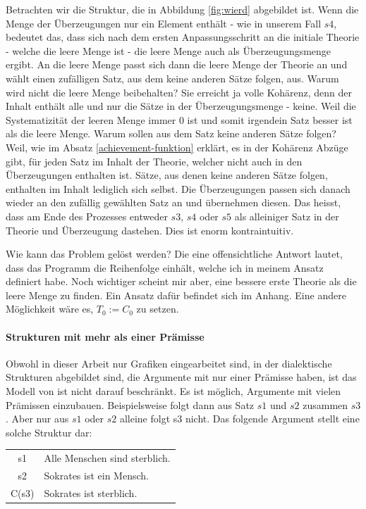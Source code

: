 \documentclass{article}
\begin{document}
Betrachten wir die Struktur, die in Abbildung \ref{fig:wierd} abgebildet ist. Wenn die Menge der Überzeugungen nur ein Element enthält - wie in unserem Fall $s4$, bedeutet das, dass sich nach dem ersten Anpassungsschritt an die initiale Theorie - welche die leere Menge ist - die leere Menge auch als Überzeugungsmenge ergibt. An die leere Menge passt sich dann die leere Menge der Theorie an und wählt einen zufälligen Satz, aus dem keine anderen Sätze folgen, aus. Warum wird nicht die leere Menge beibehalten? Sie erreicht ja volle Kohärenz, denn der Inhalt enthält alle und nur die Sätze in der Überzeugungsmenge - keine. Weil die Systematizität der leeren Menge immer 0 ist und somit irgendein Satz besser ist als die leere Menge. Warum sollen aus dem Satz keine anderen Sätze folgen? Weil, wie im Absatz \ref{achievement-funktion} erklärt, es in der Kohärenz Abzüge gibt, für jeden Satz im Inhalt der Theorie, welcher nicht auch in den Überzeugungen enthalten ist. Sätze, aus denen keine anderen Sätze folgen,  enthalten im Inhalt lediglich sich selbst.
Die Überzeugungen passen sich danach wieder an den zufällig gewählten Satz an und übernehmen diesen. Das heisst, dass am Ende des Prozesses entweder $s3$, $s4$ oder $s5$ als alleiniger Satz in der Theorie und Überzeugung dastehen. Dies ist enorm kontraintuitiv.

Wie kann das Problem gelöst werden? Die eine offensichtliche Antwort lautet, dass das Programm die Reihenfolge einhält, welche ich in meinem Ansatz definiert habe. Noch wichtiger scheint mir aber, eine bessere erste Theorie als die leere Menge zu finden. Ein Ansatz dafür befindet sich im Anhang. Eine andere Möglichkeit wäre es, $T_0 := C_0$ zu setzen.

\paragraph{Strukturen mit mehr als einer Prämisse}
Obwohl in dieser Arbeit nur Grafiken eingearbeitet sind, in der dialektische Strukturen abgebildet sind, die Argumente mit nur einer Prämisse haben, ist das Modell von \citeauthor{beisbart_making_2021} ist nicht darauf beschränkt. Es ist möglich, Argumente mit vielen Prämissen einzubauen. Beispielsweise folgt dann aus Satz $s1$ und $s2$ zusammen $s3$. Aber nur aus $s1$ oder $s2$ alleine folgt s3 nicht. Das folgende Argument stellt eine solche Struktur dar:

\begin{center}
\begin{tabular}{c p{9cm}}
s1 & Alle Menschen sind sterblich.\\
s2 & Sokrates ist ein Mensch.\\\hline
C(s3) & Sokrates ist sterblich. 
\end{tabular}
\end{center}
\end{document}
